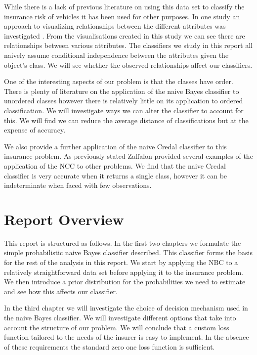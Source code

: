 While there is a lack of previous literature on using this data set to classify the insurance risk of vehicles it has been used for other purposes.
In one study an approach to visualizing relationships between the different attributes was investigated \cite{Rosario04}.
From the visualisations created in this study we can see there are relationships between various attributes.
The classifiers we study in this report all naively assume conditional independence between the attributes given the object's class.
We will see whether the observed relationships affect our classifiers.

One of the interesting aspects of our problem is that the classes have order.
There is plenty of literature on the application of the naive Bayes classifier to unordered classes however there is relatively little on its application to ordered classification.
We will investigate ways we can alter the classifier to account for this.
We will find we can reduce the average distance of classifications but at the expense of accuracy.

We also provide a further application of the naive Credal classifier to this insurance problem.
As previously stated Zaffalon provided several examples of the application of the NCC to other problems.
We find that the naive Credal classifier is very accurate when it returns a single class, however it can be indeterminate when faced with few observations.

\section{Report Overview}
This report is structured as follows. In the first two chapters we formulate the simple probabilistic naive Bayes classifier described.
This classifier forms the basis for the rest of the analysis in this report.
We start by applying the NBC to a relatively straightforward data set before applying it to the insurance problem.
We then introduce a prior distribution for the probabilities we need to estimate and see how this affects our classifier.

In the third chapter we will investigate the choice of decision mechanism used in the naive Bayes classifier.
We will investigate different options that take into account the structure of our problem.
We will conclude that a custom loss function tailored to the needs of the insurer is easy to implement.
In the absence of these requirements the standard zero one loss function is sufficient.

